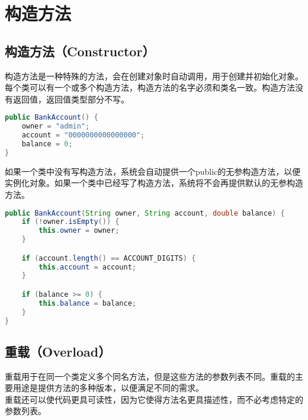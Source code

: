 \newpage

\section{构造方法}

\subsection{构造方法（Constructor）}

构造方法是一种特殊的方法，会在创建对象时自动调用，用于创建并初始化对象。每个类可以有一个或多个构造方法，构造方法的名字必须和类名一致。构造方法没有返回值，返回值类型部分不写。

\vspace{-0.5cm}

\begin{lstlisting}[language=Java]
public BankAccount() {
    owner = "admin";
    account = "0000000000000000";
    balance = 0;
}
\end{lstlisting}

如果一个类中没有写构造方法，系统会自动提供一个public的无参构造方法，以便实例化对象。如果一个类中已经写了构造方法，系统将不会再提供默认的无参构造方法。

\vspace{-0.5cm}

\begin{lstlisting}[language=Java]
public BankAccount(String owner, String account, double balance) {
    if (!owner.isEmpty()) {
        this.owner = owner;
    }

    if (account.length() == ACCOUNT_DIGITS) {
        this.account = account;
    }

    if (balance >= 0) {
        this.balance = balance;
    }
}
\end{lstlisting}

\vspace{0.5cm}

\subsection{重载（Overload）}

重载用于在同一个类定义多个同名方法，但是这些方法的参数列表不同。重载的主要用途是提供方法的多种版本，以便满足不同的需求。\\

重载还可以使代码更具可读性，因为它使得方法名更具描述性，而不必考虑特定的参数列表。\\

